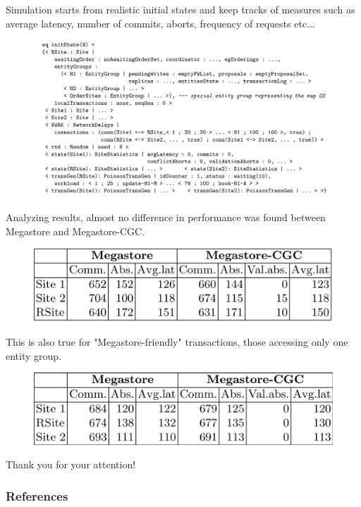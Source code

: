 \documentclass{beamer}
\begin{document}
\begin{frame}
    Simulation starts from realistic initial states and keep tracks of measures such as 
    average latency, number of commits, aborts, frequency of requests etc...
    \begin{figure}
        \includegraphics[width=\textwidth,height=\textheight,keepaspectratio]{img/init.png}
    \end{figure}
\end{frame}
\begin{frame}
    Analyzing results,  almost no difference in performance was found between Megastore and Megastore-CGC.
    \begin{figure}
        \includegraphics[width=\textwidth]{img/perf1.png}
        \end{figure}
    
    This is also true for "Megastore-friendly" transactions, those accessing 
    only one entity group.
    \begin{figure}
        \includegraphics[width=\textwidth]{img/perf2.png}
    \end{figure}
\end{frame}

\begin{frame}
    \huge
    Thank you for your attention!
\end{frame}
\begin{frame}[allowframebreaks]
      \nocite{*}
        \frametitle{References}
        
        
\end{frame}
\end{document}
